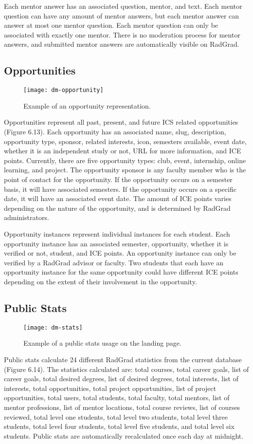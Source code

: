 Each mentor answer has an associated question, mentor, and text. Each mentor question can have any amount of mentor answers, but each mentor answer can answer at most one mentor question. Each mentor question can only be associated with exactly one mentor. There is no moderation process for mentor answers, and submitted mentor answers are automatically visible on RadGrad. 

\subsection{Opportunities}
\begin{figure}[htbp!]
\centering
\texttt{[image: dm-opportunity]}
\caption{Example of an opportunity representation.}
\end{figure}
Opportunities represent all past, present, and future ICS related opportunities (Figure 6.13).  Each opportunity has an associated name, slug, description, opportunity type, sponsor, related interests, icon, semesters available, event date, whether it is an independent study or not, URL for more information, and ICE points. Currently, there are five opportunity types: club, event, internship, online learning, and project. The opportunity sponsor is any faculty member who is the point of contact for the opportunity. If the opportunity occurs on a semester basis, it will have associated semesters. If the opportunity occurs on a specific date, it will have an associated event date. The amount of ICE points varies depending on the nature of the opportunity, and is determined by RadGrad administrators. 

Opportunity instances represent individual instances for each student. Each opportunity instance has an associated semester, opportunity, whether it is verified or not, student, and ICE points. An opportunity instance can only be verified by a RadGrad advisor or faculty. Two students that each have an opportunity instance for the same opportunity could have different ICE points depending on the extent of their involvement in the opportunity.    

\subsection{Public Stats}
\begin{figure}[htbp!]
\centering
\texttt{[image: dm-stats]}
\caption{Example of a public stats usage on the landing page.}
\end{figure}
Public stats calculate 24 different RadGrad statistics from the current database (Figure 6.14). The statistics calculated are: total courses, total career goals, list of career goals, total desired degrees, list of desired degrees, total interests, list of interests, total opportunities, total project opportunities, list of project opportunities, total users, total students, total faculty, total mentors, list of mentor professions, list of mentor locations, total course reviews, list of courses reviewed, total level one students, total level two students, total level three students, total level four students, total level five students, and total level six students. Public stats are automatically recalculated once each day at midnight. 

